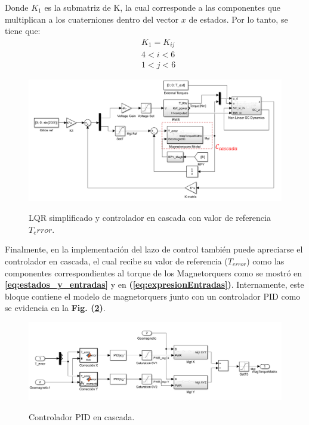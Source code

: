 Donde $K_1$ es la submatriz de K, la cual corresponde a las componentes que multiplican a los cuaterniones dentro del vector $x$ de estados. Por lo tanto, se tiene que: 
\begin{equation}
	\begin{aligned}
		&K_1= K_{ij}\\ 
		&4<i<6\\
		&1<j<6 		
	\end{aligned}	
\end{equation}
\newpage
\begin{figure}[!ht]
	\begin{center}
		\includegraphics[scale=0.6]{imagenes/controladores/lqr.PNG}\\
	\end{center}
	\caption{LQR simplificado y controlador en cascada con valor de referencia $T_error$.}
	\label{fig:lqr}	 	
\end{figure}

 Finalmente, en la implementación del lazo de control también puede apreciarse el controlador en cascada, el cual recibe su valor de referencia ($T_{error}$) como las componentes correspondientes al torque de los Magnetorquers como se mostró en \textbf{\eqref{eq:estados_y_entradas}} y en \textbf{(\ref{eq:expresionEntradas})}. Internamente, este bloque contiene el modelo de magnetorquers junto con un controlador PID como se evidencia en la \textbf{Fig. (\ref{fig:lqr_cascada})}.
 
\begin{figure}[!ht]
	\begin{center}
		\includegraphics[scale=0.45]{imagenes/controladores/cascada.PNG}\\
	\end{center}
	\caption{Controlador PID en cascada.}
	\label{fig:lqr_cascada}	 	
\end{figure}
\newpage

